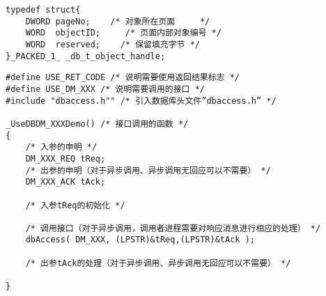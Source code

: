 ﻿\documentclass[12pt,a4paper,onecolumn]{article}
\begin{document}
\begin{footnotesize}
\begin{lstlisting}
typedef struct{
    DWORD pageNo;    /* 对象所在页面     */
    WORD  objectID;     /* 页面内部对象编号 */
    WORD  reserved;    /* 保留填充字节 */
}_PACKED_1_ _db_t_object_handle;
\end{lstlisting}
\end{footnotesize}

\pagebreak
\begin{footnotesize}
\begin{lstlisting}
#define USE_RET_CODE /* 说明需要使用返回结果标志 */
#define USE_DM_XXX /* 说明需要调用的接口 */
#include "dbaccess.h"" /* 引入数据库头文件”dbaccess.h” */

_UseDBDM_XXXDemo() /* 接口调用的函数 */
{
    /* 入参的申明 */    
    DM_XXX_REQ tReq;
    /* 出参的申明（对于异步调用、异步调用无回应可以不需要） */
    DM_XXX_ACK tAck; 

    /* 入参tReq的初始化 */
    
    /* 调用接口（对于异步调用，调用者进程需要对响应消息进行相应的处理） */
    dbAccess( DM_XXX, (LPSTR)&tReq,(LPSTR)&tAck ); 

    /* 出参tAck的处理（对于异步调用、异步调用无回应可以不需要） */

}
\end{lstlisting}
\end{footnotesize}
\end{document}
